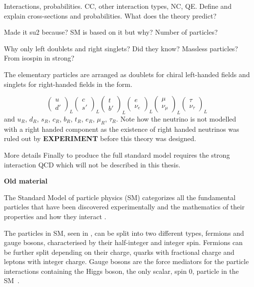 Interactions, probabilities. CC, other interaction types, NC, QE. Define and explain cross-sections and probabilities. What does the theory predict?


Made it su2  because? SM is based on it but why? Number of particles?

Why only left doublets and right singlets? Did they know? Massless particles? From isospin in strong?

The elementary particles are arranged as doublets for chiral left-handed fields and singlets for right-handed fields in the form.

\begin{equation}
\begin{pmatrix}
    u\\
    d'
\end{pmatrix}_L
\begin{pmatrix}
    c\\
    s'
\end{pmatrix}_L
\begin{pmatrix}
    t\\
    b'
\end{pmatrix}_L
\begin{pmatrix}
    e\\
    \nu_e
\end{pmatrix}_L
\begin{pmatrix}
    \mu\\
    \nu_\mu
\end{pmatrix}_L
\begin{pmatrix}
    \tau\\
    \nu_\tau
\end{pmatrix}_L
\end{equation}
and $u_R$,  $d_R$, $s_R$, $c_R$, $b_R$, $t_R$, $e_R$, $\mu_R$, $\tau_R$. 
Note how the neutrino is not modelled with a right handed component as the existence of right handed neutrinos was ruled out by \textbf{EXPERIMENT} before this theory was designed.

More details
\fi
Finally to produce the full standard model requires the strong interaction QCD which will not be described in this thesis.

\textbf{Old material}

The Standard Model of particle physics (SM) categorizes all the fundamental particles that have been discovered experimentally and the mathematics of their properties and how they interact \cite{32Burchan:1995, 38griffiths}. 

The particles in SM, seen in , can be split into two different types, fermions and gauge bosons, characterised by their half-integer and integer spin. Fermions can be further split depending on their charge, quarks with fractional charge and leptons with integer charge. Gauge bosons are the force mediators for the particle interactions containing the Higgs boson, the only scalar, spin 0, particle in the SM~\cite{35Higgs}.

